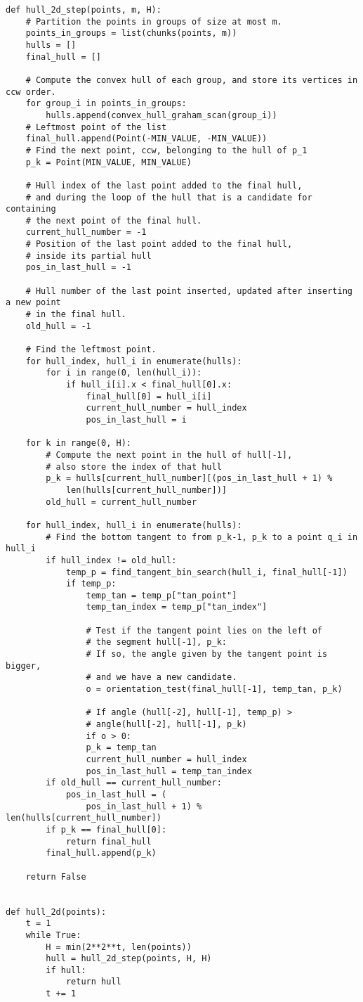 \documentclass[
12pt,
a4paper,
oneside,
headinclude,
footinclude]{report}
\theoremstyle{definition} %
\begin{document}
\begin{verbatim}
def hull_2d_step(points, m, H):
	# Partition the points in groups of size at most m.
	points_in_groups = list(chunks(points, m))
	hulls = []	
	final_hull = []
	
	# Compute the convex hull of each group, and store its vertices in ccw order.
	for group_i in points_in_groups:
		hulls.append(convex_hull_graham_scan(group_i))
	# Leftmost point of the list
	final_hull.append(Point(-MIN_VALUE, -MIN_VALUE))
	# Find the next point, ccw, belonging to the hull of p_1
	p_k = Point(MIN_VALUE, MIN_VALUE)
	
	# Hull index of the last point added to the final hull,
	# and during the loop of the hull that is a candidate for containing 
	# the next point of the final hull.
	current_hull_number = -1
	# Position of the last point added to the final hull, 
	# inside its partial hull
	pos_in_last_hull = -1
	
	# Hull number of the last point inserted, updated after inserting a new point 
	# in the final hull.
	old_hull = -1
	
	# Find the leftmost point.
	for hull_index, hull_i in enumerate(hulls):
		for i in range(0, len(hull_i)):
			if hull_i[i].x < final_hull[0].x:
				final_hull[0] = hull_i[i]
				current_hull_number = hull_index
				pos_in_last_hull = i
	
	for k in range(0, H):
		# Compute the next point in the hull of hull[-1],
		# also store the index of that hull
		p_k = hulls[current_hull_number][(pos_in_last_hull + 1) %
			len(hulls[current_hull_number])]
		old_hull = current_hull_number
	
	for hull_index, hull_i in enumerate(hulls):
		# Find the bottom tangent to from p_k-1, p_k to a point q_i in hull_i
		if hull_index != old_hull:
			temp_p = find_tangent_bin_search(hull_i, final_hull[-1])
			if temp_p:
				temp_tan = temp_p["tan_point"]
				temp_tan_index = temp_p["tan_index"]
		
				# Test if the tangent point lies on the left of 
				# the segment hull[-1], p_k:
				# If so, the angle given by the tangent point is bigger,
				# and we have a new candidate.
				o = orientation_test(final_hull[-1], temp_tan, p_k)
				
				# If angle (hull[-2], hull[-1], temp_p) > 
				# angle(hull[-2], hull[-1], p_k)
				if o > 0:
				p_k = temp_tan
				current_hull_number = hull_index
				pos_in_last_hull = temp_tan_index
		if old_hull == current_hull_number:
			pos_in_last_hull = (
				pos_in_last_hull + 1) % len(hulls[current_hull_number])
		if p_k == final_hull[0]:
			return final_hull
		final_hull.append(p_k)
	
	return False


def hull_2d(points):
	t = 1
	while True:
		H = min(2**2**t, len(points))
		hull = hull_2d_step(points, H, H)
		if hull:
			return hull
		t += 1
\end{verbatim}
\end{document}
